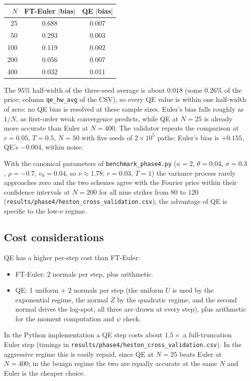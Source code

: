 \documentclass[11pt]{article}
\theoremstyle{plain}
\theoremstyle{definition}
\theoremstyle{remark}
\begin{document}
\begin{center}
\begin{tabular}{rcc}
\toprule
$N$ & FT-Euler $|$bias$|$ & QE $|$bias$|$ \\
\midrule
25 & 0.688 & 0.007 \\
50 & 0.293 & 0.003 \\
100 & 0.119 & 0.002 \\
200 & 0.056 & 0.007 \\
400 & 0.032 & 0.011 \\
\bottomrule
\end{tabular}
\end{center}
The $95\%$ half-width of the three-seed average is about $0.018$ (some $0.26\%$ of the price; column \texttt{qe\_hw\_avg} of the CSV), so every QE value is within one half-width of zero: no QE bias is resolved at these sample sizes. Euler's bias falls roughly as $1/N$, as first-order weak convergence predicts, while QE at $N = 25$ is already more accurate than Euler at $N = 400$. The validator repeats the comparison at $r = 0.05$, $T = 0.5$, $N = 50$ with five seeds of $2 \times 10^5$ paths: Euler's bias is $+0.155$, QE's $-0.004$, within noise.

With the canonical parameters of \texttt{benchmark\_phase4.py} ($\kappa = 2$, $\theta = 0.04$, $\sigma = 0.3$, $\rho = -0.7$, $v_0 = 0.04$, so $\nu \approx 1.78$; $r = 0.03$, $T = 1$) the variance process rarely approaches zero and the two schemes agree with the Fourier price within their confidence intervals at $N = 200$ for all nine strikes from $80$ to $120$ (\texttt{results/phase4/heston\_cross\_validation.csv}); the advantage of QE is specific to the low-$\nu$ regime.

\subsection{Cost considerations}

QE has a higher per-step cost than FT-Euler:
\begin{itemize}[topsep=2pt]
    \item FT-Euler: 2 normals per step, plus arithmetic.
    \item QE: 1 uniform + 2 normals per step (the uniform $U$ is used by the exponential regime, the normal $Z$ by the quadratic regime, and the second normal drives the log-spot; all three are drawn at every step), plus arithmetic for the moment computation and $\psi$ check.
\end{itemize}
In the Python implementation a QE step costs about $1.5\times$ a full-truncation Euler step (timings in \texttt{results/phase4/heston\_cross\_validation.csv}). In the aggressive regime this is easily repaid, since QE at $N = 25$ beats Euler at $N = 400$; in the benign regime the two are equally accurate at the same $N$ and Euler is the cheaper choice.
\end{document}
